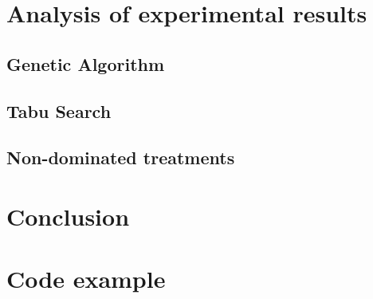 \documentclass{article} %
\begin{document}



\section{Analysis of experimental results}
\label{analysis_results}


\subsection{Genetic Algorithm}



\subsection{Tabu Search}



\subsection{Non-dominated treatments}



\section{Conclusion}







\newpage
\section{Code example}
\end{document}
